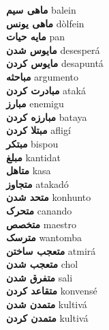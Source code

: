 \textbf{ ماهی سیم  } balein \\
\textbf{ ماهی یونس  } dòlfein \\
\textbf{ مایه حیات  } pan \\
\textbf{ مایوس شدن  } desesperá \\
\textbf{ مایوس کردن  } desapuntá \\
\textbf{ مباحثه  } argumento \\
\textbf{ مبادرت کردن  } ataká \\
\textbf{ مبارز  } enemigu \\
\textbf{ مبارزه کردن  } bataya \\
\textbf{ مبتلا کردن  } afligí \\
\textbf{ مبتکر  } bispou \\
\textbf{ مبلغ  } kantidat \\
\textbf{ متاهل  } kasa \\
\textbf{ متجاوز  } atakadó \\
\textbf{ متحد شدن  } konhunto \\
\textbf{ متحرک  } canando \\
\textbf{ متخصص  } maestro \\
\textbf{ مترسک  } wantomba \\
\textbf{ متعجب ساختن  } atmirá \\
\textbf{ متعجب شدن  } chol \\
\textbf{ متفرق شدن  } sali \\
\textbf{ متقاعد کردن  } konvensé \\
\textbf{ متمدن شدن  } kultivá \\
\textbf{ متمدن کردن  } kultivá \\
